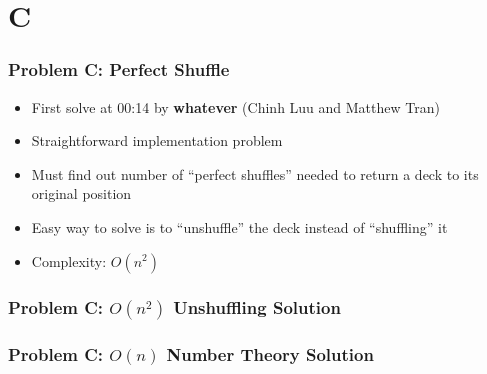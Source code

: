 \section{C}%
\label{sec:c}

\begin{frame}
  \frametitle{Problem C: Perfect Shuffle}

  \begin{itemize}
    \item First solve at 00:14 by \textbf{whatever} (Chinh Luu and Matthew Tran)
    \item Straightforward implementation problem
    \item Must find out number of ``perfect shuffles'' needed to return a deck to its original position
    \item Easy way to solve is to ``unshuffle'' the deck instead of ``shuffling'' it
    \item Complexity: $O(n^2)$
  \end{itemize}

\end{frame}

\begin{frame}
  \frametitle{Problem C: $O(n^2)$ Unshuffling Solution}

\end{frame}

\begin{frame}
  \frametitle{Problem C: $O(n)$ Number Theory Solution}

\end{frame}
